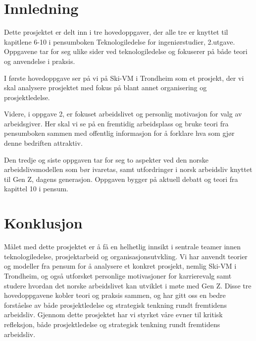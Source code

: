 \documentclass[a4paper,12pt]{article}
\begin{document}


\setcounter{page}{1}
\renewcommand{\contentsname}{Innholdsfortegnelse}
\tableofcontents
\newpage

\section*{Innledning}

Dette prosjektet er delt inn i tre hovedoppgaver, der alle tre er knyttet til kapitlene 6-10 i pensumboken Teknologiledelse for ingeniørstudier, 2.utgave.
Oppgavene tar for seg ulike sider ved teknologiledelse og fokuserer på både teori og anvendelse i praksis.

I første hovedoppgave ser på vi på Ski-VM i Trondheim som et prosjekt, der vi skal analysere prosjektet med fokus på blant annet organisering og prosjektledelse.

Videre, i oppgave 2, er fokuset arbeidslivet og personlig motivasjon for valg av arbeidsgiver. Her skal vi se på en fremtidig arbeidsplass og bruke teori fra pensumboken sammen med offentlig informasjon for å forklare hva som gjør denne bedriften attraktiv.

Den tredje og siste oppgaven tar for seg to aspekter ved den norske arbeidslivsmodellen som bør ivaretas, samt utfordringer i norsk arbeidsliv knyttet til Gen Z, dagens generasjon. Oppgaven bygger på aktuell debatt og teori fra kapittel 10 i pensum.






\section*{Konklusjon}
Målet med dette prosjektet er å få en helhetlig innsikt i sentrale teamer innen teknologiledelse, prosjektarbeid og organisasjonsutvkling.
Vi har anvendt teorier og modeller fra pensum for å analysere et konkret prosjekt, nemlig Ski-VM i Trondheim, og også utforsket personlige motivasjoner for karrierevalg samt studere hvordan det norske arbeidslivet kan utviklet i møte med Gen Z.
Disse tre hovedoppgavene kobler teori og praksis sammen, og har gitt oss en bedre forståelse av både prosjektledelse og strategisk tenkning rundt fremtidens arbeidsliv. Gjennom dette prosjektet har vi styrket våre evner til kritisk refleksjon, både prosjektledelse og strategisk tenkning rundt fremtidens arbeidsliv.

\printbibliography[heading=bibintoc, title={Referanser}]
\end{document}
